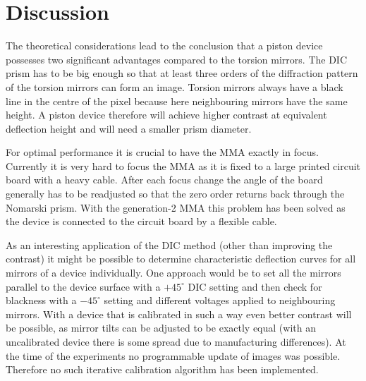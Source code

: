 \section{Discussion}
The theoretical considerations lead to the conclusion that a piston
device possesses two significant advantages compared to the torsion
mirrors. The DIC prism has to be big enough so that at least three
orders of the diffraction pattern of the torsion mirrors can form an
image. Torsion mirrors always have a black line in the centre of the
pixel because here neighbouring mirrors have the same height. A piston
device therefore will achieve higher contrast at equivalent deflection
height and will need a smaller prism diameter.

For optimal performance it is crucial to have the MMA exactly in
focus. Currently it is very hard to focus the MMA as it is fixed to a
large printed circuit board with a heavy cable. After each focus
change the angle of the board generally has to be readjusted so that
the zero order returns back through the Nomarski prism. With the
generation-2 MMA this problem has been solved as the device is
connected to the circuit board by a flexible cable.

As an interesting application of the DIC method (other than improving
the contrast) it might be possible to determine characteristic
deflection curves for all mirrors of a device individually. One
approach would be to set all the mirrors parallel to the device
surface with a $+45^\circ$ DIC setting and then check for blackness
with a $-45^\circ$ setting and different voltages applied to
neighbouring mirrors. With a device that is calibrated in such a way
even better contrast will be possible, as mirror tilts can be adjusted
to be exactly equal (with an uncalibrated device there is some spread
due to manufacturing differences). At the time of the experiments no
programmable update of images was possible. Therefore no such iterative
calibration algorithm has been implemented.
